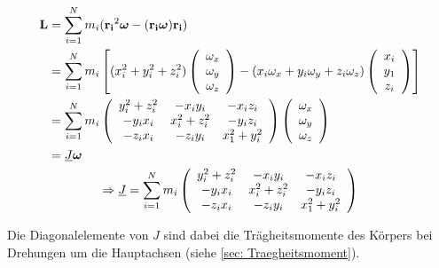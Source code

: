 \begin{gather}
    \begin{aligned}
    \boldsymbol{\mathbf{L}}&=\sum_{i=1}^{N} m_i (\boldsymbol{\mathbf{r_i}}^2\boldsymbol{\mathbf{\omega}}-(\boldsymbol{\mathbf{r_i\omega}})\boldsymbol{\mathbf{r_i}})\\
            &=\sum_{i=1}^{N} m_i\left[(x_i^2+y_i^2+z_i^2)
              \left(\begin{array}{c} \omega_x \\ \omega_y \\ \omega_z \end{array}\right)
              - (x_i\omega_x+y_i\omega_y+z_i\omega_z)
              \left(\begin{array}{c} x_i \\ y_1 \\ z_i \end{array}\right)\right]\\
            &=\sum_{i=1}^{N} m_i
              \left(\begin{array}{ccc} y_i^2+z_i^2 & -x_iy_i & -x_iz_i \\ -y_ix_i & x_i^2+z_i^2 & -y_iz_i \\ -z_ix_i & -z_iy_i & x_1^2+y_i^2 \end{array}\right) 
              \left(\begin{array}{c} \omega_x \\ \omega_y \\ \omega_z \end{array}\right) \\
            &=\underline{J}\boldsymbol{\mathbf{\omega}}
    \end{aligned} \\
    \Rightarrow \underline{J} = \sum_{i=1}^{N} m_i
                                \left(\begin{array}{ccc} y_i^2+z_i^2 & -x_iy_i & -x_iz_i \\ -y_ix_i & x_i^2+z_i^2 & -y_iz_i \\ -z_ix_i & -z_iy_i & x_1^2+y_i^2 \end{array}\right)
\end{gather}

Die Diagonalelemente von $J$ sind dabei die Trägheitsmomente des Körpers bei Drehungen um die Hauptachsen (siehe \ref{sec: Traegheitsmoment}).